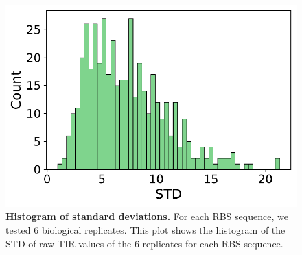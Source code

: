 \begin{figure}[!ht]
   \centering
    \includegraphics[scale=0.4]{plots/Supplementary/SDhist.pdf}
   \caption{\textbf{Histogram of standard deviations.}
   For each RBS sequence, we tested 6 biological replicates. This plot shows the histogram of the STD of raw TIR values of the 6 replicates for each RBS sequence. }
   \label{fig: SDhist}
\end{figure}

